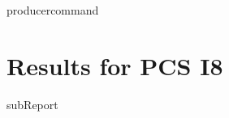 {{ producercommand }}
\renewcommand{\DTRPcs}{I8} %
\renewcommand{\DTRPcsLong}{I8}


    \section{Results for PCS \DTRPcsLong}

    {{subReport}}
    \newpage

